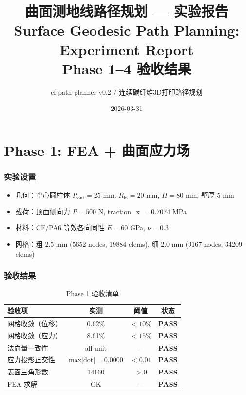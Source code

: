\documentclass[11pt,a4paper]{article}
\title{\vspace{-1cm}\textsf{\textbf{曲面测地线路径规划 --- 实验报告}}\\
\large Surface Geodesic Path Planning: Experiment Report\\
Phase 1--4 验收结果}
\author{cf-path-planner v0.2 / 连续碳纤维3D打印路径规划}
\date{2026-03-31}
\begin{document}
\maketitle
\thispagestyle{fancy}

\tableofcontents
\newpage

\part{Phase 1: FEA + 曲面应力场}

\section{实验设置}

\begin{itemize}[nosep]
\item 几何：空心圆柱体 $R_{\text{out}} = 25$ mm, $R_{\text{in}} = 20$ mm, $H = 80$ mm, 壁厚 5 mm
\item 载荷：顶面侧向力 $P = 500$ N, traction\_x $= 0.7074$ MPa
\item 材料：CF/PA6 等效各向同性 $E = 60$ GPa, $\nu = 0.3$
\item 网格：粗 2.5 mm (5652 nodes, 19884 elems), 细 2.0 mm (9167 nodes, 34209 elems)
\end{itemize}

\section{验收结果}

\begin{table}[H]
\centering
\begin{tabularx}{\textwidth}{X c c c}
\toprule
\textbf{验收项} & \textbf{实测} & \textbf{阈值} & \textbf{状态} \\
\midrule
网格收敛（位移）& 0.62\% & $<10\%$ & \textcolor{pass}{\textbf{PASS}} \\
网格收敛（应力）& 8.61\% & $<15\%$ & \textcolor{pass}{\textbf{PASS}} \\
法向量一致性 & all unit & --- & \textcolor{pass}{\textbf{PASS}} \\
应力投影正交性 & max$|$dot$| = 0.0000$ & $<0.01$ & \textcolor{pass}{\textbf{PASS}} \\
表面三角形数 & 14160 & $>0$ & \textcolor{pass}{\textbf{PASS}} \\
FEA 求解 & OK & --- & \textcolor{pass}{\textbf{PASS}} \\
\bottomrule
\end{tabularx}
\caption{Phase 1 验收清单}
\end{table}
\end{document}
